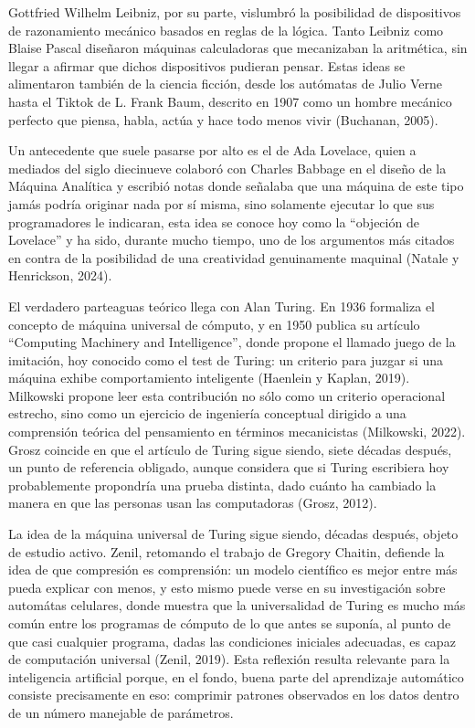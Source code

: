 \documentclass[12pt,letterpaper]{article}
\begin{document}
Gottfried Wilhelm Leibniz, por su parte, vislumbr\'o la posibilidad de dispositivos de razonamiento mec\'anico basados en reglas de la l\'ogica. Tanto Leibniz como Blaise Pascal dise\~naron m\'aquinas calculadoras que mecanizaban la aritm\'etica, sin llegar a afirmar que dichos dispositivos pudieran pensar. Estas ideas se alimentaron tambi\'en de la ciencia ficci\'on, desde los aut\'omatas de Julio Verne hasta el Tiktok de L. Frank Baum, descrito en 1907 como un hombre mec\'anico perfecto que piensa, habla, act\'ua y hace todo menos vivir (Buchanan, 2005).

Un antecedente que suele pasarse por alto es el de Ada Lovelace, quien a mediados del siglo diecinueve colabor\'o con Charles Babbage en el dise\~no de la M\'aquina Anal\'itica y escribi\'o notas donde se\~nalaba que una m\'aquina de este tipo jam\'as podr\'ia originar nada por s\'i misma, sino solamente ejecutar lo que sus programadores le indicaran, esta idea se conoce hoy como la ``objeci\'on de Lovelace'' y ha sido, durante mucho tiempo, uno de los argumentos m\'as citados en contra de la posibilidad de una creatividad genuinamente maquinal (Natale y Henrickson, 2024).

El verdadero parteaguas te\'orico llega con Alan Turing. En 1936 formaliza el concepto de m\'aquina universal de c\'omputo, y en 1950 publica su art\'iculo ``Computing Machinery and Intelligence'', donde propone el llamado juego de la imitaci\'on, hoy conocido como el test de Turing: un criterio para juzgar si una m\'aquina exhibe comportamiento inteligente (Haenlein y Kaplan, 2019). Milkowski propone leer esta contribuci\'on no s\'olo como un criterio operacional estrecho, sino como un ejercicio de ingenier\'ia conceptual dirigido a una comprensi\'on te\'orica del pensamiento en t\'erminos mecanicistas (Milkowski, 2022). Grosz coincide en que el art\'iculo de Turing sigue siendo, siete d\'ecadas despu\'es, un punto de referencia obligado, aunque considera que si Turing escribiera hoy probablemente propondr\'ia una prueba distinta, dado cu\'anto ha cambiado la manera en que las personas usan las computadoras (Grosz, 2012).

La idea de la m\'aquina universal de Turing sigue siendo, d\'ecadas despu\'es, objeto de estudio activo. Zenil, retomando el trabajo de Gregory Chaitin, defiende la idea de que compresi\'on es comprensi\'on: un modelo cient\'ifico es mejor entre m\'as pueda explicar con menos, y esto mismo puede verse en su investigaci\'on sobre autom\'atas celulares, donde muestra que la universalidad de Turing es mucho m\'as com\'un entre los programas de c\'omputo de lo que antes se supon\'ia, al punto de que casi cualquier programa, dadas las condiciones iniciales adecuadas, es capaz de computaci\'on universal (Zenil, 2019). Esta reflexi\'on resulta relevante para la inteligencia artificial porque, en el fondo, buena parte del aprendizaje autom\'atico consiste precisamente en eso: comprimir patrones observados en los datos dentro de un n\'umero manejable de par\'ametros.
\end{document}
